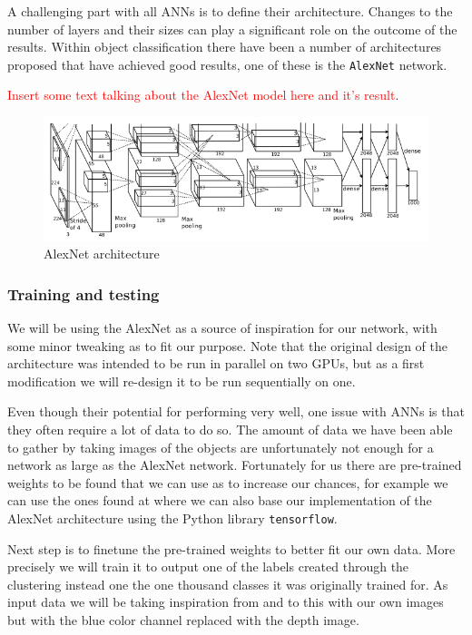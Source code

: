 A challenging part with all ANNs is to define their architecture. Changes to the number of layers and their sizes can play a significant role on the outcome of the results. Within object classification there have been a number of architectures proposed that have achieved good results, one of these is the \texttt{AlexNet} network.

\textcolor{red}{Insert some text talking about the AlexNet model here and it's result}.

\begin{figure}
	\centering
	\includegraphics[width=\textwidth]{img/methods/alexnet_original.png}
	\caption{AlexNet architecture}
	\label{fig:alexnet_orig}
\end{figure}


\subsubsection{Training and testing}

We will be using the AlexNet as a source of inspiration for our network, with some minor tweaking as to fit our purpose. Note that the original design of the architecture was intended to be run in parallel on two GPUs, but as a first modification we will re-design it to be run sequentially on one.

Even though their potential for performing very well, one issue with ANNs is that they often require a lot of data to do so. The amount of data we have been able to gather by taking images of the objects are unfortunately not enough for a network as large as the AlexNet network. Fortunately for us there are pre-trained weights to be found that we can use as to increase our chances, for example we can use the ones found at \parencite{AlexNetImplWeights} where we can also base our implementation of the AlexNet architecture using the Python library \texttt{tensorflow}.

Next step is to finetune the pre-trained weights to better fit our own data. More precisely we will train it to output one of the labels created through the clustering instead one the one thousand classes it was originally trained for. As input data we will be taking inspiration from \parencite{Redmon2014} and to this with our own images but with the blue color channel replaced with the depth image.
